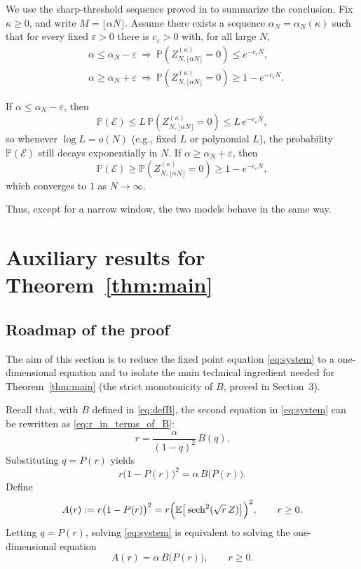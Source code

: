 \documentclass[11pt]{article}
\begin{document}
We use the sharp-threshold sequence proved in \cite{Xu2021, NakajimaSun2022} to summarize the conclusion.
Fix $\kappa\ge 0$, and write $M=\lfloor \alpha N\rfloor$.
Assume there exists a sequence $\alpha_N=\alpha_N(\kappa)$ such that for every fixed $\varepsilon>0$ there is $c_\varepsilon>0$ with, for all large $N$,
\begin{equation}\label{eq:sharp-seq-exp}
\begin{split}
 & \alpha\le \alpha_N-\varepsilon
\ \Longrightarrow\
\mathbb P\!\left(Z_{N,\lfloor \alpha N\rfloor}^{(\kappa)}=0\right)\le e^{-c_\varepsilon N},\\
&\alpha\ge \alpha_N+\varepsilon
\ \Longrightarrow\
\mathbb P\!\left(Z_{N,\lfloor \alpha N\rfloor}^{(\kappa)}=0\right)\ge 1-e^{-c_\varepsilon N}.
\end{split}
\end{equation}

If $\alpha\le \alpha_N-\varepsilon$, then
\[
\mathbb P(\mathcal E)\le L\,\mathbb P\!\left(Z_{N,\lfloor \alpha N\rfloor}^{(\kappa)}=0\right)\le L\,e^{-c_\varepsilon N},
\]
so whenever $\log L=o(N)$ (e.g., fixed $L$ or polynomial $L$), the probability $\mathbb P(\mathcal E)$ still decays exponentially in $N$. If $\alpha\ge \alpha_N+\varepsilon$, then
\[
\mathbb P(\mathcal E)\ge \mathbb P\!\left(Z_{N,\lfloor \alpha N\rfloor}^{(\kappa)}=0\right)\ge 1-e^{-c_\varepsilon N},
\]
which converges to $1$ as $N\to \infty$.

Thus, except for a narrow window, the two models behave in the same way.

\section{Auxiliary results for Theorem~\ref{thm:main}}
\subsection{Roadmap of the proof}
The aim of this section is to reduce the fixed point equation \eqref{eq:system} to a one-dimensional equation and to isolate the main technical ingredient needed for Theorem~\ref{thm:main} (the strict monotonicity of $B$, proved in Section~3).

Recall that, with $B$ defined in \eqref{eq:defB}, the second equation in \eqref{eq:system} can be rewritten as \eqref{eq:r_in_terms_of_B}:
\[
r=\frac{\alpha}{(1-q)^2}\,B(q).
\]
Substituting $q=P(r)$ yields
\[
r\bigl(1-P(r)\bigr)^2=\alpha\,B\bigl(P(r)\bigr).
\]
Define
\begin{equation}\label{eq:defA}
A(r):=r\bigl(1-P(r)\bigr)^2
=r\Bigl(\mathbb E\big[\operatorname{sech}^2(\sqrt{r}\,Z)\big]\Bigr)^2,\qquad r\ge 0.
\end{equation}
Letting $q=P(r)$,
 solving \eqref{eq:system} is equivalent to solving the one-dimensional equation
\begin{equation}\label{eq:one-dimensional}
A(r)=\alpha\,B\bigl(P(r)\bigr),\qquad r\ge 0.
\end{equation}
\end{document}
